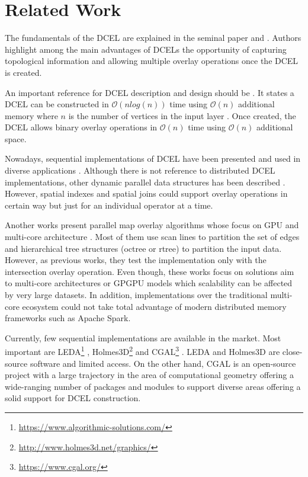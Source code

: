 \section{Related Work}
\label{sec:related}
The fundamentals of the DCEL are explained in the seminal paper \cite{muller_finding_1978} and \cite{preparata_computational_1985}.  Authors highlight among the main advantages of DCELs the opportunity of capturing topological information and allowing multiple overlay operations once the DCEL is created.  

An important reference for DCEL description and design should be \cite{berg_computational_2008}.  It states a DCEL can be constructed in $\mathcal{O}(n log(n))$ time using $\mathcal{O}(n)$ additional memory where $n$ is the number of vertices in the input layer \cite{freiseisen_colored_1998}. Once created, the DCEL allows binary overlay operations in $\mathcal{O}(n)$ time using $\mathcal{O}(n)$ additional space. 

Nowadays, sequential implementations of DCEL have been presented and used in diverse applications \cite{barequet_dcel_1998, boltcheva_topological-based_2020, freiseisen_colored_1998}. Although there is not reference to distributed DCEL implementations, other dynamic parallel data structures has been described \cite{challa_dd-rtree_2016, sabek_spatial_2017, li_scalable_2019}.  However, spatial indexes and spatial joins could support overlay operations in certain way but just for an individual operator at a time. 

Another works present parallel map overlay algorithms whose focus on GPU and multi-core architecture \cite{franklin_data_2018, magalhaes_fast_2015, puri_efficient_2013, puri_mapreduce_2013}.  Most of them use scan lines to partition the set of edges and hierarchical tree structures (octree or rtree) to partition the input data. However, as previous works, they test the implementation only with the intersection overlay operation. Even though, these works focus on solutions aim to multi-core architectures or GPGPU models which scalability can be affected by very large datasets.  In addition, implementations over the traditional multi-core ecosystem could not take total advantage of modern distributed memory frameworks such as Apache Spark.

Currently, few sequential implementations are available in the market.  Most important are LEDA\footnote{\url{https://www.algorithmic-solutions.com/}} \cite{mehlhorn_leda_1995}, Holmes3D\footnote{\url{http://www.holmes3d.net/graphics/}} \cite{holmes_dcel_2021} and CGAL\footnote{\url{https://www.cgal.org/}} \cite{fogel_cgal_2012}.  LEDA and Holmes3D are close-source software and limited access.  On the other hand, CGAL is an open-source project with a large trajectory in the area of computational geometry offering a wide-ranging number of packages and modules to support diverse areas offering a solid support for DCEL construction.
